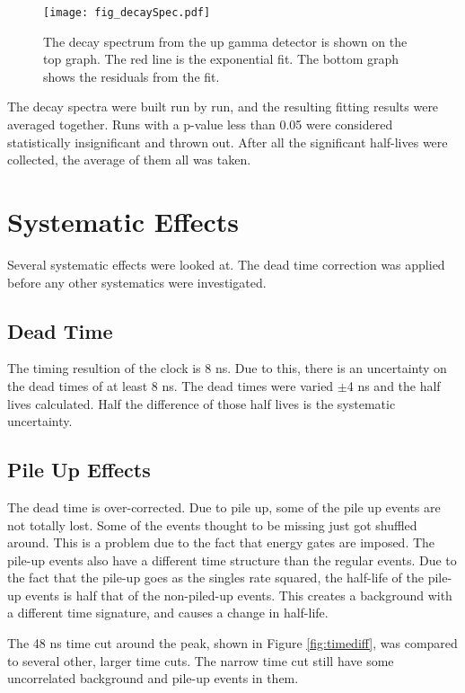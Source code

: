 \begin{figure}[!htb]
\centerline{\texttt{[image: fig\_decaySpec.pdf]}}
\caption{The decay spectrum from the up gamma detector is shown on the top graph.
	The red line is the exponential fit. 
	The bottom graph shows the residuals from the fit. 
	}
\label{fig:60secdecay}
\end{figure}


The decay spectra were built run by run, and the resulting fitting results were averaged together. 
Runs with a p-value less than 0.05 were considered statistically insignificant and thrown out.
After all the significant half-lives were collected, the average of them all was taken.

\section{Systematic Effects}
Several systematic effects were looked at.
The dead time correction was applied before any other systematics were investigated. 

\subsection{Dead Time}
The timing resultion of the clock is 8 ns.
Due to this, there is an uncertainty on the dead times of at least 8 ns.
The dead times were varied $\pm$4 ns and the half lives calculated.
Half the difference of those half lives is the systematic uncertainty.

\subsection{Pile Up Effects}
The dead time is over-corrected. 
Due to pile up, some of the pile up events are not totally lost.
Some of the events thought to be missing just got shuffled around.
This is a problem due to the fact that energy gates are imposed.
The pile-up events also have a different time structure than the regular events.
Due to the fact that the pile-up goes as the singles rate squared, the half-life of the pile-up events is half that of the non-piled-up events.
This creates a background with a different time signature, and causes a change in half-life.

The 48 ns time cut around the peak, shown in Figure \ref{fig:timediff}, was compared to several other, larger time cuts.
The narrow time cut still have some uncorrelated background and pile-up events in them.


